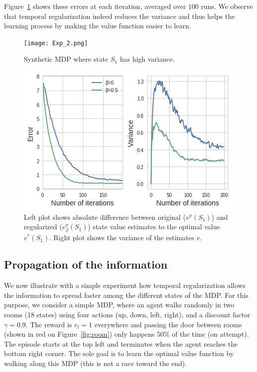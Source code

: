 \documentclass{article}
\newcommand{\param}{\beta}
\newcommand{\V}{v}
\newcommand{\Vr}{\V_{\param}}
\begin{document}
Figure~\ref{fig:perf_MDP} shows these errors at each iteration, averaged over $100$ runs. We observe that temporal regularization indeed reduces the variance and thus helps the learning process by making the value function easier to learn.


\begin{figure}
\begin{minipage}[c]{0.45\linewidth}
\texttt{[image: Exp\_2.png]}
\caption{Synthetic MDP where state $S_1$ has high variance.}
\label{fig:MDP}
\end{minipage}
\hfill
\begin{minipage}[c]{0.45\linewidth}
\includegraphics[width=\linewidth]{Exp_2_result.png}
\caption{Left plot shows absolute difference between original ($\V^{\pi}(S_1)$) and regularized ($\Vr^{\pi}(S_1)$) state value estimates to the optimal value $\V^*(S_1)$. Right plot shows the variance of the estimates $\V$.}
\label{fig:perf_MDP}
\end{minipage}%
\end{figure}

\subsection{Propagation of the information}
We now illustrate with a simple experiment how temporal regularization allows the information to spread faster among the different states of the MDP. For this purpose, we consider a simple MDP, where an agent walks randomly in two rooms (18 states) using four actions (up, down, left, right), and a discount factor $\gamma=0.9$. The reward is $r_t=1$ everywhere and passing the door between rooms (shown in red on Figure~\ref{fig:room}) only happens 50\% of the time (on attempt). The episode starts at the top left and terminates when the agent reaches the bottom right corner. The sole goal is to learn the optimal value function by walking along this MDP (this is not a race toward the end).
\end{document}
